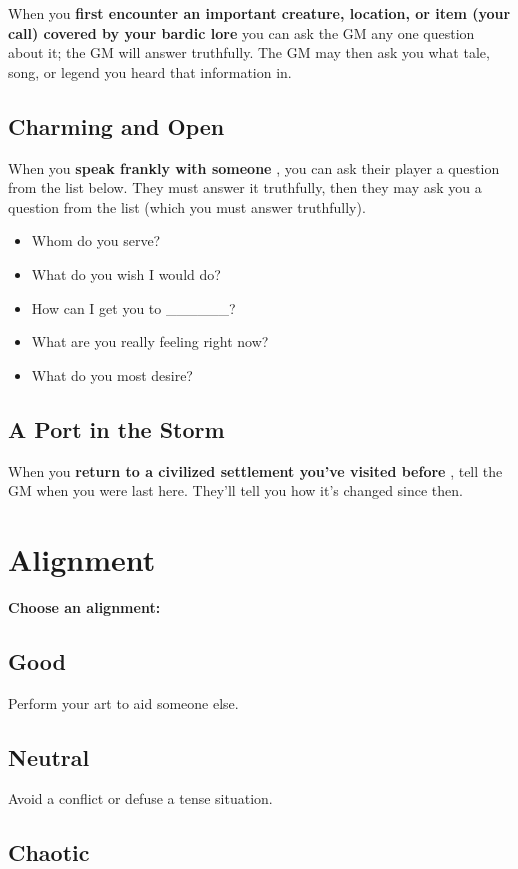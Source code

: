  When you \textbf{first encounter an important creature, location, or item (your call) covered by your bardic lore}
 you can ask the GM any one question about it; the GM will answer truthfully. The GM may then ask you what tale, song, or legend you heard that information in.
\subsection{Charming and Open}


 When you \textbf{speak frankly with someone}
, you can ask their player a question from the list below. They must answer it truthfully, then they may ask you a question from the list (which you must answer truthfully).
\begin{itemize}
\item Whom do you serve?
\item What do you wish I would do?
\item How can I get you to \_\_\_\_\_\_?
\item What are you really feeling right now?
\item What do you most desire?

\end{itemize}
\subsection{A Port in the Storm}


 When you \textbf{return to a civilized settlement you've visited before}
, tell the GM when you were last here. They'll tell you how it's changed since then.
\section*{Alignment}


{\bfseries Choose an alignment:}
\subsection{Good}


 Perform your art to aid someone else.
\subsection{Neutral}


 Avoid a conflict or defuse a tense situation.
\subsection{Chaotic}


